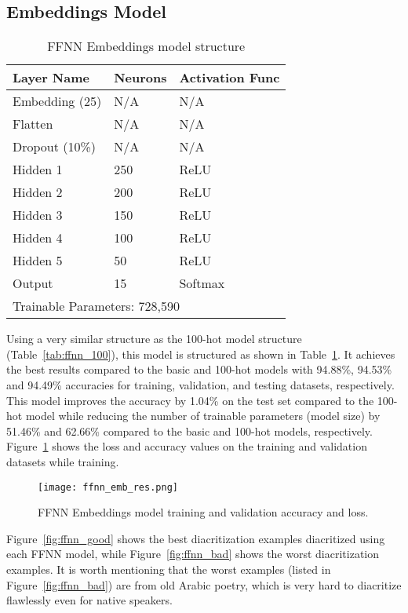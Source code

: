\documentclass[11pt,a4paper]{article}
\begin{document}
\subsection{Embeddings Model}

\begin{table}[h]
\centering
\caption{FFNN Embeddings model structure}
\label{tab:ffnn_emb}
\begin{tabular}{|l|l|l|}
\hline
Layer Name & Neurons & Activation Func \\ \hline
Embedding (25) & N/A & N/A \\ \hline
Flatten & N/A & N/A \\ \hline
Dropout (10\%) & N/A & N/A \\ \hline
Hidden 1 & 250 & ReLU \\ \hline
Hidden 2 & 200 & ReLU \\ \hline
Hidden 3 & 150 & ReLU \\ \hline
Hidden 4 & 100 & ReLU \\ \hline
Hidden 5 & 50 & ReLU \\ \hline
Output & 15 & Softmax \\ \hline
\multicolumn{3}{|l|}{Trainable Parameters: 728,590} \\ \hline
\end{tabular}
\end{table}

Using a very similar structure as the 100-hot model structure (Table~\ref{tab:ffnn_100}), this model is structured as shown in Table~\ref{tab:ffnn_emb}. It achieves the best results compared to the basic and 100-hot models with 94.88\%, 94.53\% and 94.49\% accuracies for training, validation, and testing datasets, respectively. This model improves the accuracy by 1.04\% on the test set compared to the 100-hot model while reducing the number of trainable parameters (model size) by 51.46\% and 62.66\% compared to the basic and 100-hot models, respectively. Figure~\ref{fig:ffnn_emb_res} shows the loss and accuracy values on the training and validation datasets while training.

\begin{figure}[h]
    \centering
    \texttt{[image: ffnn\_emb\_res.png]}
    \caption{FFNN Embeddings model training and validation accuracy and loss.}
    \label{fig:ffnn_emb_res}
\end{figure}

Figure~\ref{fig:ffnn_good} shows the best diacritization examples diacritized using each FFNN model, while Figure~\ref{fig:ffnn_bad} shows the worst diacritization examples. It is worth mentioning that the worst examples (listed in Figure~\ref{fig:ffnn_bad}) are from old Arabic poetry, which is very hard to diacritize flawlessly even for native speakers.
\end{document}

